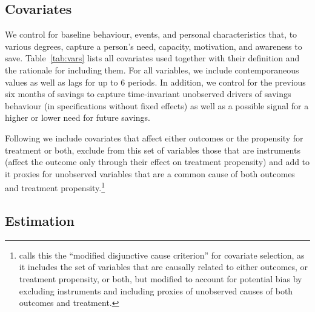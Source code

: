 \subsection{Covariates}%
\label{sub:covariates}

We control for baseline behaviour, events, and personal characteristics that,
to various degrees, capture a person's need, capacity, motivation, and
awareness to save. Table~\ref{tab:vars} lists all covariates used
together with their definition and the rationale for including them. For all
variables, we include contemporaneous values as well as lags for up to 6
periods. In addition, we control for the previous six months of savings to
capture time-invariant unobserved drivers of savings behaviour (in
specifications without fixed effects) as well as a possible signal for a higher
or lower need for future savings.

Following \citet{vanderweele2019principles} we include covariates that affect
either outcomes or the propensity for treatment or both, exclude from this
set of variables those that are instruments (affect the outcome only through their effect on
treatment propensity) and add to it proxies for unobserved variables that are a
common cause of both outcomes and treatment propensity.\footnote{
\citet{vanderweele2019principles} calls this the ``modified disjunctive cause
criterion'' for covariate selection, as it includes the set of variables that are causally
related to either outcomes, or treatment propensity, or both, but modified to
account for potential bias by excluding instruments and including proxies of
unobserved causes of both outcomes and treatment.}

\subsection{Estimation}%
\label{sub:difference_in_difference}

